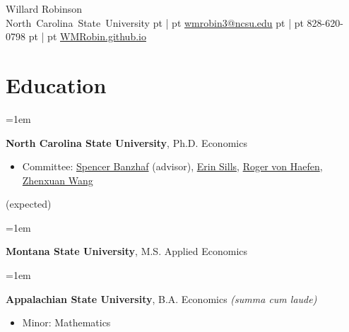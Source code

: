 \documentclass[12pt]{article}
\newenvironment{highlights}{
	\begin{itemize}[
		topsep=0.10 cm,
		partopsep=0pt,
		leftmargin=0.3 cm + 10pt,
		label={}
		]
	\setlength{\parsep}{0.10cm}\setlength{\itemsep}{0pt}
	}{
	\end{itemize}
}
\newenvironment{twocolentry}[2][]{%
	\par\noindent\def\secondColumn{#2}%
	\begin{minipage}[t]{\linewidth-5.1cm}\raggedright\hangindent=1em\hangafter=1\relax%
	}
	{%
		\end{minipage}\hfill%
		\begin{minipage}[t]{5cm}\raggedleft\secondColumn\end{minipage}\par\smallskip
	}
\newenvironment{header}{
	\setlength{\topsep}{0pt}\par\kern\topsep\centering\linespread{1.5}
}{
	\par\kern\topsep
}
\newcommand{\AND}{\unskip\hspace{5pt}|\hspace{5pt}\ignorespaces}
\begin{document}

\begin{header}
    {\fontsize{20 pt}{15 pt}\selectfont Willard Robinson} \\
    \small
    \mbox{North Carolina State University}%
     pt%
    \AND%
     pt%
    \mbox{\href{mailto:wmrobin3@ncsu.edu}{wmrobin3@ncsu.edu}}%
     pt%
    \AND%
     pt%
    \mbox{828-620-0798}%
     pt%
    \AND%
     pt%
    \mbox{\href{https://WMRobin.github.io/}{WMRobin.github.io}}%
\end{header}

\vspace{-1ex}

\section{Education}

\begin{twocolentry}{2027 (expected)}
    \textbf{North Carolina State University}, Ph.D. Economics
    \vspace{-0.5ex}
    \begin{highlights}
        \item \small Committee:
        \href{https://spencerbanzhaf.wordpress.ncsu.edu/}{Spencer Banzhaf} (advisor),
        \href{https://cnr.ncsu.edu/directory/erin-o-sills/}{Erin Sills},
        \href{https://rvhaefen.wordpress.ncsu.edu/}{Roger von Haefen},
        \href{https://www.zhenxuanwang.org/}{Zhenxuan Wang}
    \end{highlights}
\end{twocolentry}

\begin{twocolentry}{2022}
    \textbf{Montana State University}, M.S. Applied Economics
\end{twocolentry}

\begin{twocolentry}{2020}
    \textbf{Appalachian State University}, B.A. Economics
    \emph{\footnotesize (summa cum laude)}
    \vspace{-0.5ex}
    \begin{highlights}
        \item \small Minor: Mathematics
    \end{highlights}
\end{twocolentry}
\end{document}
